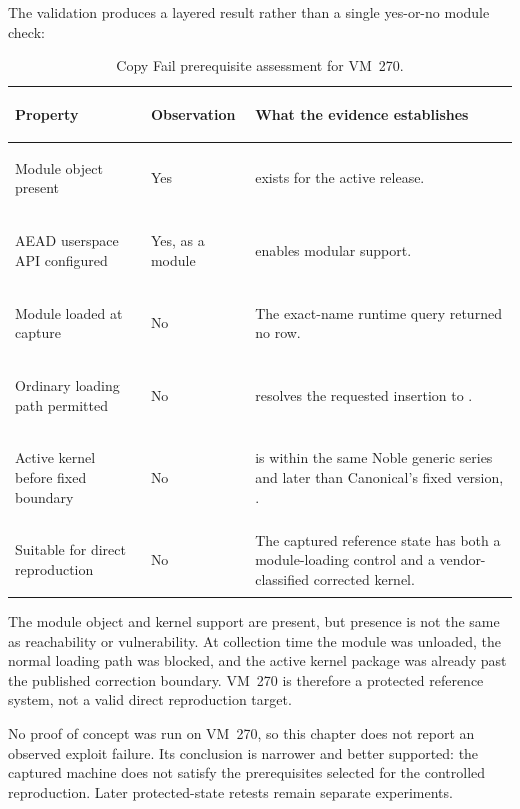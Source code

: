 The validation produces a layered result rather than a single yes-or-no module
check:

\begin{table}[H]
    \centering
    \caption{Copy Fail prerequisite assessment for VM~270.}
    \label{tab:reference-system-validation}
    \small
    \begin{tabularx}{\textwidth}{@{}>{\bfseries\raggedright\arraybackslash}p{}>{\raggedright\arraybackslash}p{}Y@{}}
        \toprule
        Property & Observation & What the evidence establishes \\
        \midrule
        Module object present &
        Yes &
         exists for the active release. \\

        AEAD userspace API configured &
        Yes, as a module &
         enables modular support. \\

        Module loaded at capture &
        No &
        The exact-name runtime query returned no row. \\

        Ordinary loading path permitted &
        No &
         resolves the requested insertion to
        . \\

        Active kernel before fixed boundary &
        No &
         is within the same Noble generic series and later
        than Canonical's fixed version, . \\

        Suitable for direct reproduction &
        No &
        The captured reference state has both a module-loading control and a
        vendor-classified corrected kernel. \\
        \bottomrule
    \end{tabularx}
\end{table}

The module object and kernel support are present, but presence is not the same
as reachability or vulnerability. At collection time the module was unloaded,
the normal loading path was blocked, and the active kernel package was already
past the published correction boundary. VM~270 is therefore a protected
reference system, not a valid direct reproduction target.

No proof of concept was run on VM~270, so this chapter does not report an
observed exploit failure. Its conclusion is narrower and better supported: the
captured machine does not satisfy the prerequisites selected for the controlled
reproduction. Later protected-state retests remain separate experiments.

